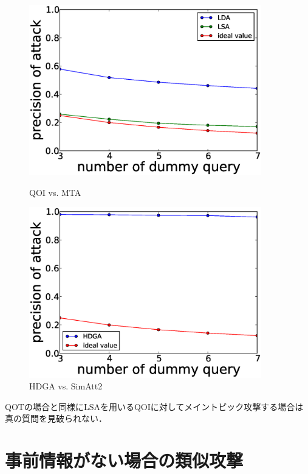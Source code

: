 \documentclass[master]{suribt}
\theoremstyle{definition}
\begin{document}
 \begin{figure}
 \begin{minipage}[t]{0.5\linewidth}
 \centering
 \includegraphics[width=0.9\textwidth]{BBBB1.eps}
 \vspace{5em}
 \caption{QOI vs. MTA}
 \label{fig:mt:BBBB}
 \end{minipage}%
 \begin{minipage}[t]{0.5\linewidth}
 \centering
 \includegraphics[width=0.9\textwidth]{HDGA1.eps}
 \vspace{5em}
 \caption{HDGA vs. SimAtt2}
 \label{fig:s2:HDGA}
 \end{minipage}
 \end{figure}

 QOTの場合と同様にLSAを用いるQOIに対してメイントピック攻撃する場合は真の質問を見破られない．
 
 \section{事前情報がない場合の類似攻撃}
\end{document}
